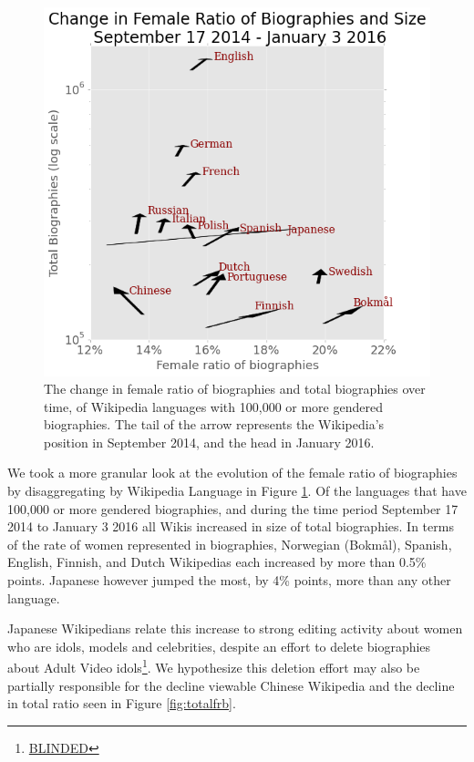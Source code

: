 \documentclass{sig-alternate-05-2015}
\begin{document}
\begin{figure}
\includegraphics[width=\columnwidth]{figures/arrowplot_flippedaxes.png} 
\caption{The change in female ratio of biographies and total biographies over time, of Wikipedia languages with 100,000 or more gendered biographies. The tail of the arrow represents the Wikipedia's position in September 2014, and the head in January 2016.}
\label{fig:changefrb}
\end{figure}

We took a more granular look at the evolution of the female ratio of biographies by disaggregating by Wikipedia Language in Figure \ref{fig:changefrb}. Of the languages that have 100,000 or more gendered biographies, and during the time period September 17 2014 to January 3 2016 all Wikis increased in size of total biographies. In terms of the rate of women represented in biographies, Norwegian (Bokm\aa l), Spanish, English, Finnish, and Dutch Wikipedias each increased by more than 0.5\% points. Japanese however jumped the most, by 4\% points, more than any other language. 

Japanese Wikipedians relate this increase to strong editing activity about women who are idols, models and celebrities, despite an effort to delete biographies about Adult Video idols\footnote{\url{BLINDED}}. We hypothesize this deletion effort may also be partially responsible for the decline viewable Chinese Wikipedia and the decline in total ratio seen in Figure \ref{fig:totalfrb}.
\end{document}
